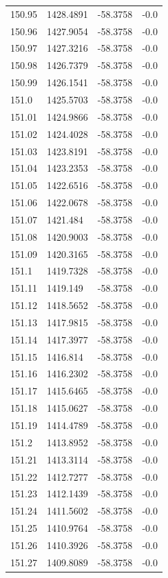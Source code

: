 \begin{table}[H]
\begin{tabular}{llll}
150.95 & 1428.4891 & -58.3758 & -0.0 \\
150.96 & 1427.9054 & -58.3758 & -0.0 \\
150.97 & 1427.3216 & -58.3758 & -0.0 \\
150.98 & 1426.7379 & -58.3758 & -0.0 \\
150.99 & 1426.1541 & -58.3758 & -0.0 \\
151.0 & 1425.5703 & -58.3758 & -0.0 \\
151.01 & 1424.9866 & -58.3758 & -0.0 \\
151.02 & 1424.4028 & -58.3758 & -0.0 \\
151.03 & 1423.8191 & -58.3758 & -0.0 \\
151.04 & 1423.2353 & -58.3758 & -0.0 \\
151.05 & 1422.6516 & -58.3758 & -0.0 \\
151.06 & 1422.0678 & -58.3758 & -0.0 \\
151.07 & 1421.484 & -58.3758 & -0.0 \\
151.08 & 1420.9003 & -58.3758 & -0.0 \\
151.09 & 1420.3165 & -58.3758 & -0.0 \\
151.1 & 1419.7328 & -58.3758 & -0.0 \\
151.11 & 1419.149 & -58.3758 & -0.0 \\
151.12 & 1418.5652 & -58.3758 & -0.0 \\
151.13 & 1417.9815 & -58.3758 & -0.0 \\
151.14 & 1417.3977 & -58.3758 & -0.0 \\
151.15 & 1416.814 & -58.3758 & -0.0 \\
151.16 & 1416.2302 & -58.3758 & -0.0 \\
151.17 & 1415.6465 & -58.3758 & -0.0 \\
151.18 & 1415.0627 & -58.3758 & -0.0 \\
151.19 & 1414.4789 & -58.3758 & -0.0 \\
151.2 & 1413.8952 & -58.3758 & -0.0 \\
151.21 & 1413.3114 & -58.3758 & -0.0 \\
151.22 & 1412.7277 & -58.3758 & -0.0 \\
151.23 & 1412.1439 & -58.3758 & -0.0 \\
151.24 & 1411.5602 & -58.3758 & -0.0 \\
151.25 & 1410.9764 & -58.3758 & -0.0 \\
151.26 & 1410.3926 & -58.3758 & -0.0 \\
151.27 & 1409.8089 & -58.3758 & -0.0 \\

\end{tabular}
\end{table}
